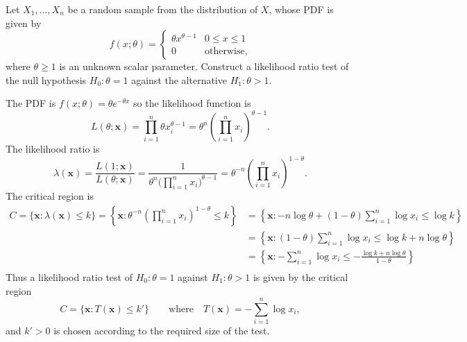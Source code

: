 \begin{example}
Let $X_1,\ldots,X_n$ be a random sample from the distribution of $X$, whose PDF is given by
\[
f(x;\theta) = \begin{cases}
	\theta x^{\theta-1}	& 0\leq x\leq 1 \\
	0					& \text{otherwise,}
\end{cases}
\]
where $\theta\geq 1$ is an unknown scalar parameter. Construct a likelihood ratio test of the null hypothesis $H_0:\theta=1$ against the alternative $H_1:\theta>1$.
\begin{solution}
The PDF is $f(x;\theta) = \theta e^{-\theta x}$ so the likelihood function is
\[
L(\theta;\mathbf{x}) 
	= \textstyle\prod_{i=1}^n \theta x_i^{\theta-1} 
	= \theta^n\left(\prod_{i=1}^n x_i\right)^{\theta-1}.
\]
The likelihood ratio is
\[
\lambda(\mathbf{x})
	= \frac{L(1;\mathbf{x})}{L(\theta;\mathbf{x})} 
	= \frac{1}{\theta^n\big(\prod_{i=1}^n x_i\big)^{\theta-1}}
	= \theta^{-n}\left(\prod_{i=1}^n x_i\right)^{1-\theta}.
\]
The critical region is 
\begin{align*}
C = \{\mathbf{x}:\lambda(\mathbf{x}) \leq k\} 
	= \left\{\mathbf{x}:\theta^{-n}\left(\prod_{i=1}^n x_i\right)^{1-\theta} \leq k\right\}
	& = \left\{\mathbf{x}: -n\log\theta + (1-\theta)\sum_{i=1}^n \log x_i \leq \log k \right\} \\
	& = \left\{\mathbf{x}: (1-\theta)\sum_{i=1}^n\log x_i \leq \log k + n\log\theta\right\}\\
	& = \left\{\mathbf{x}: -\sum_{i=1}^n \log x_i \leq -\frac{\log k + n\log\theta}{1-\theta}\right\} \\
\end{align*}
Thus a likelihood ratio test of $H_0:\theta=1$ against $H_1:\theta>1$ is given by the critical region
\[
C = \{\mathbf{x}: T(\mathbf{x}) \leq k'\} \qquad\text{where}\quad T(\mathbf{x}) = -\sum_{i=1}^n \log x_i,
\]
and $k'>0$ is chosen according to the required size of the test.
\end{solution}
\end{example}

